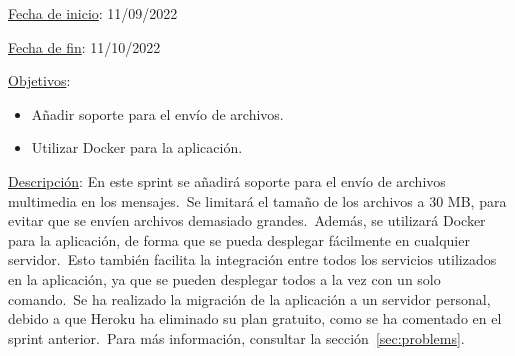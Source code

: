 
\underline{Fecha de inicio}: 11/09/2022

\underline{Fecha de fin}: 11/10/2022

\underline{Objetivos}:
\begin{itemize}
	\item Añadir soporte para el envío de archivos.
	\item Utilizar Docker para la aplicación.
\end{itemize}

\underline{Descripción}:
En este sprint se añadirá soporte para el envío de archivos multimedia en los mensajes.\ Se limitará el tamaño de
los archivos a 30 MB, para evitar que se envíen archivos demasiado grandes.\ Además, se utilizará Docker para
la aplicación, de forma que se pueda desplegar fácilmente en cualquier servidor.\ Esto también facilita la integración
entre todos los servicios utilizados en la aplicación, ya que se pueden desplegar todos a la vez con un solo
comando.\ Se ha realizado la migración de la aplicación a un servidor personal, debido a que Heroku ha eliminado
su plan gratuito, como se ha comentado en el sprint anterior.\ Para más información, consultar la
sección~\ref{sec:problems}.
